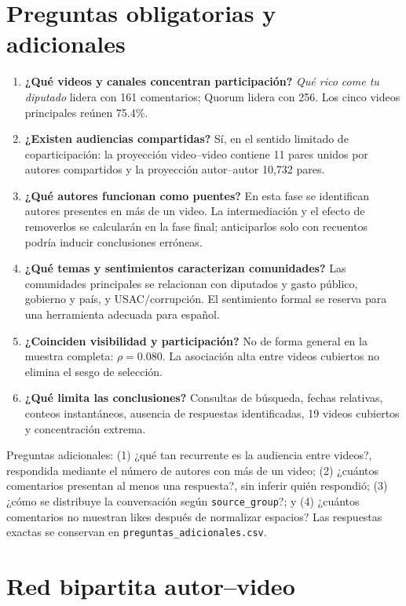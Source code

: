 \documentclass[11pt]{article}
\begin{document}
\section{Preguntas obligatorias y adicionales}

\begin{enumerate}
  \item \textbf{¿Qué videos y canales concentran participación?} \emph{Qué rico come tu diputado} lidera con 161 comentarios; Quorum lidera con 256. Los cinco videos principales reúnen 75.4\%.
  \item \textbf{¿Existen audiencias compartidas?} Sí, en el sentido limitado de coparticipación: la proyección video--video contiene 11 pares unidos por autores compartidos y la proyección autor--autor 10,732 pares.
  \item \textbf{¿Qué autores funcionan como puentes?} En esta fase se identifican autores presentes en más de un video. La intermediación y el efecto de removerlos se calcularán en la fase final; anticiparlos solo con recuentos podría inducir conclusiones erróneas.
  \item \textbf{¿Qué temas y sentimientos caracterizan comunidades?} Las comunidades principales se relacionan con diputados y gasto público, gobierno y país, y USAC/corrupción. El sentimiento formal se reserva para una herramienta adecuada para español.
  \item \textbf{¿Coinciden visibilidad y participación?} No de forma general en la muestra completa: $\rho=0.080$. La asociación alta entre videos cubiertos no elimina el sesgo de selección.
  \item \textbf{¿Qué limita las conclusiones?} Consultas de búsqueda, fechas relativas, conteos instantáneos, ausencia de respuestas identificadas, 19 videos cubiertos y concentración extrema.
\end{enumerate}

Preguntas adicionales: (1) ¿qué tan recurrente es la audiencia entre videos?, respondida mediante el número de autores con más de un video; (2) ¿cuántos comentarios presentan al menos una respuesta?, sin inferir quién respondió; (3) ¿cómo se distribuye la conversación según \texttt{source\_group}?; y (4) ¿cuántos comentarios no muestran likes después de normalizar espacios? Las respuestas exactas se conservan en \texttt{preguntas\_adicionales.csv}.

\section{Red bipartita autor--video}
\end{document}
